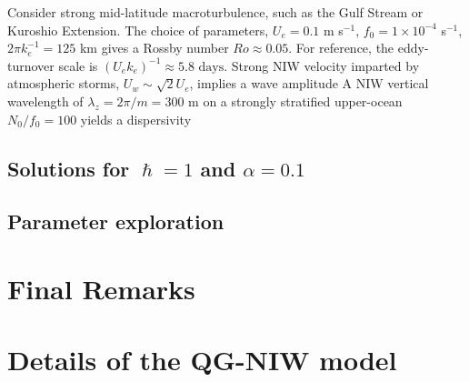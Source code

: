 \documentclass{jfm}
\begin{document}
Consider strong mid-latitude macroturbulence, such as the Gulf Stream or Kuroshio
Extension. The choice of parameters, $U_e = 0.1$ m s$^{-1}$,
$f_0 = 1 \times 10^{-4}$ s$^{-1}$, $2\pi k_e^{-1} = 125$ km
gives a Rossby number $Ro \approx  0.05$. For reference, the eddy-turnover scale
is $(U_e k_e)^{-1}\approx 5.8\,\,\text{days}$. Strong NIW velocity imparted by
atmospheric storms, $U_w \sim \sqrt{2} U_e$, implies a wave amplitude
\beq
  \alpha {}\per
\eeq
A NIW vertical wavelength of $\lambda_z = 2\pi/m = 300$ m \citep[e.g., ][]{alford_etal2016}
on a strongly stratified upper-ocean $N_0/f_0 = 100$ yields a dispersivity
\beq
  \hslash {} \per
\eeq

\subsection{Solutions for $\hslash = 1$ and $\alpha = 0.1$}

\subsection{Parameter exploration}

\section{Final Remarks}

\appendix

\section{Details of the QG-NIW model}
\end{document}
